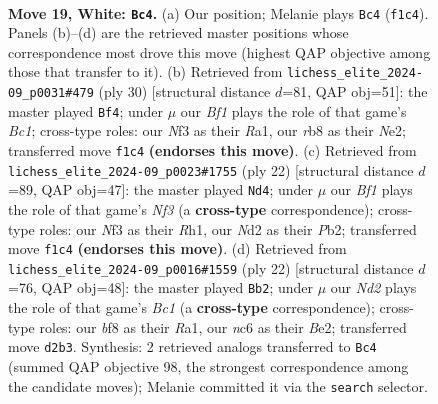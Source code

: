 \documentclass[11pt]{article}
\begin{document}
\clearpage

\begin{figure}[p]\centering
\begin{subfigure}{0.46\textwidth}\centering
\resizebox{\linewidth}{!}{%
\newchessgame
\chessboard[
  setfen={1rb2b1r/1p3k1p/p1n1p1p1/4Pp2/n4B2/5NP1/PP1N1P1P/R1K2BR1 w - - 2 19},
  showmover=false,
  pgfstyle=straightmove, color=movearrow, markmove={f1-c4}
]}
\caption{}
\end{subfigure}\hfill
\begin{subfigure}{0.46\textwidth}\centering
\resizebox{\linewidth}{!}{%
\newchessgame
\chessboard[
  setfen={r1b4r/pp3kpp/1bp5/3p4/1n1P4/2N3P1/PP2NP1P/R1B2RK1 w - - 1 16},
  showmover=false,
  pgfstyle=straightmove, color=movearrow, markmove={c1-f4}
]}
\caption{}
\end{subfigure}
\\[4pt]
\begin{subfigure}{0.46\textwidth}\centering
\resizebox{\linewidth}{!}{%
\newchessgame
\chessboard[
  setfen={rn2kbnr/pp2pp1p/2p3pP/8/8/4BNN1/PPb2PP1/R3KB1R w KQkq - 0 12},
  showmover=false,
  pgfstyle=straightmove, color=movearrow, markmove={f3-d4}
]}
\caption{}
\end{subfigure}\hfill
\begin{subfigure}{0.46\textwidth}\centering
\resizebox{\linewidth}{!}{%
\newchessgame
\chessboard[
  setfen={r1b2rk1/5ppp/p1n1pn2/1pb5/8/1PN1PN2/P3BPPP/R1BR2K1 w - - 2 12},
  showmover=false,
  pgfstyle=straightmove, color=movearrow, markmove={c1-b2}
]}
\caption{}
\end{subfigure}
\caption{\textbf{Move 19, White: \texttt{Bc4}.} (a) Our position; Melanie plays \texttt{Bc4} (\texttt{f1c4}). Panels (b)--(d) are the retrieved master positions whose correspondence most drove this move (highest QAP objective among those that transfer to it). (b) Retrieved from \texttt{lichess\_elite\_2024-09\_p0031\#479} (ply 30) [structural distance $d$=81, QAP obj=51]: the master played \texttt{Bf4}; under $\mu$ our \emph{Bf1} plays the role of that game's \emph{Bc1}; cross-type roles: our \emph{N}f3 as their \emph{R}a1, our \emph{r}b8 as their \emph{N}e2; transferred move \texttt{f1c4} \textbf{(endorses this move)}. (c) Retrieved from \texttt{lichess\_elite\_2024-09\_p0023\#1755} (ply 22) [structural distance $d$=89, QAP obj=47]: the master played \texttt{Nd4}; under $\mu$ our \emph{Bf1} plays the role of that game's \emph{Nf3} (a \textbf{cross-type} correspondence); cross-type roles: our \emph{N}f3 as their \emph{R}h1, our \emph{N}d2 as their \emph{P}b2; transferred move \texttt{f1c4} \textbf{(endorses this move)}. (d) Retrieved from \texttt{lichess\_elite\_2024-09\_p0016\#1559} (ply 22) [structural distance $d$=76, QAP obj=48]: the master played \texttt{Bb2}; under $\mu$ our \emph{Nd2} plays the role of that game's \emph{Bc1} (a \textbf{cross-type} correspondence); cross-type roles: our \emph{b}f8 as their \emph{R}a1, our \emph{n}c6 as their \emph{B}e2; transferred move \texttt{d2b3}. Synthesis: 2 retrieved analogs transferred to \texttt{Bc4} (summed QAP objective 98, the strongest correspondence among the candidate moves); Melanie committed it via the \texttt{search} selector.}
\label{fig:thought-m36}
\end{figure}
\end{document}
